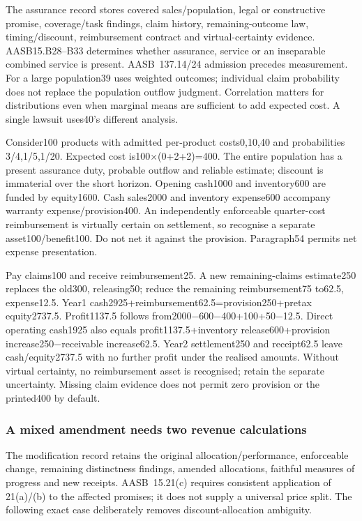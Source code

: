 The assurance record stores covered sales/population, legal or constructive promise, coverage/task findings, claim history, remaining-outcome law, timing/discount, reimbursement contract and virtual-certainty evidence. AASB15.B28--B33 determines whether assurance, service or an inseparable combined service is present. AASB~137.14/24 \citep[paras.~14,24,36--62]{aasb137dated} admission precedes measurement. For a large population39 uses weighted outcomes; individual claim probability does not replace the population outflow judgment. Correlation matters for distributions even when marginal means are sufficient to add expected cost. A single lawsuit uses40's different analysis.

Consider100 products with admitted per-product costs0,10,40 and probabilities 3/4,1/5,1/20. Expected cost is100×(0+2+2)=400. The entire population has a present assurance duty, probable outflow and reliable estimate; discount is immaterial over the short horizon. Opening cash1000 and inventory600 are funded by equity1600. Cash sales2000 and inventory expense600 accompany warranty expense/provision400. An independently enforceable quarter-cost reimbursement is virtually certain on settlement, so recognise a separate asset100/benefit100. Do not net it against the provision. Paragraph54 permits net expense presentation.

Pay claims100 and receive reimbursement25. A new remaining-claims estimate250 replaces the old300, releasing50; reduce the remaining reimbursement75 to62.5, expense12.5. Year1 cash2925+reimbursement62.5=provision250+pretax equity2737.5. Profit1137.5 follows from2000−600−400+100+50−12.5. Direct operating cash1925 also equals profit1137.5+inventory release600+provision increase250−receivable increase62.5. Year2 settlement250 and receipt62.5 leave cash/equity2737.5 with no further profit under the realised amounts. Without virtual certainty, no reimbursement asset is recognised; retain the separate uncertainty. Missing claim evidence does not permit zero provision or the printed400 by default.

\hypertarget{a-mixed-amendment-needs-two-revenue-calculations}{%
\subsubsection{A mixed amendment needs two revenue calculations}\label{a-mixed-amendment-needs-two-revenue-calculations}}

The modification record retains the original allocation/performance, enforceable change, remaining distinctness findings, amended allocations, faithful measures of progress and new receipts. AASB~15.21(c) \citep[paras.~18--21,39--45,73--90]{aasb15dated} requires consistent application of 21(a)/(b) to the affected promises; it does not supply a universal price split. The following exact case deliberately removes discount-allocation ambiguity.

